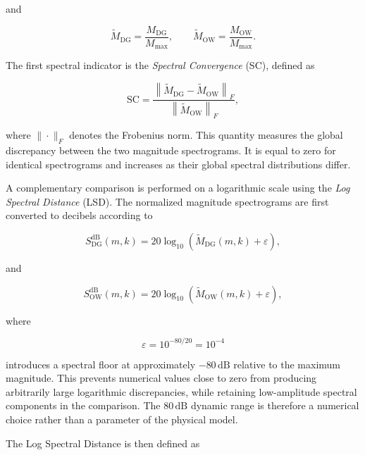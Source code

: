 \documentclass[11pt,a4paper]{report}
\theoremstyle{plain}
\theoremstyle{definition}
\begin{document}
and

\begin{equation}
\widetilde M_{\mathrm{DG}}
=
\frac{M_{\mathrm{DG}}}{M_{\max}},
\qquad
\widetilde M_{\mathrm{OW}}
=
\frac{M_{\mathrm{OW}}}{M_{\max}}.
\end{equation}

The first spectral indicator is the \emph{Spectral Convergence} (SC), defined
as

\begin{equation}
\boxed{
\mathrm{SC}
=
\frac{
\left\|
\widetilde M_{\mathrm{DG}}
-
\widetilde M_{\mathrm{OW}}
\right\|_F
}{
\left\|
\widetilde M_{\mathrm{OW}}
\right\|_F
},
}
\label{eq:spectral_convergence_openwind}
\end{equation}

where \(\|\cdot\|_F\) denotes the Frobenius norm. This quantity measures the
global discrepancy between the two magnitude spectrograms. It is equal to zero
for identical spectrograms and increases as their global spectral distributions
differ.

A complementary comparison is performed on a logarithmic scale using the
\emph{Log Spectral Distance} (LSD). The normalized magnitude spectrograms are
first converted to decibels according to

\begin{equation}
S_{\mathrm{DG}}^{\mathrm{dB}}(m,k)
=
20\log_{10}
\left(
\widetilde M_{\mathrm{DG}}(m,k)+\varepsilon
\right),
\end{equation}

and

\begin{equation}
S_{\mathrm{OW}}^{\mathrm{dB}}(m,k)
=
20\log_{10}
\left(
\widetilde M_{\mathrm{OW}}(m,k)+\varepsilon
\right),
\end{equation}

where

\begin{equation}
\varepsilon
=
10^{-80/20}
=
10^{-4}
\end{equation}

introduces a spectral floor at approximately \(-80\,\mathrm{dB}\) relative
to the maximum magnitude. This prevents numerical values close to zero from
producing arbitrarily large logarithmic discrepancies, while retaining
low-amplitude spectral components in the comparison. The \(80\,\mathrm{dB}\)
dynamic range is therefore a numerical choice rather than a parameter of the
physical model.

The Log Spectral Distance is then defined as
\end{document}
